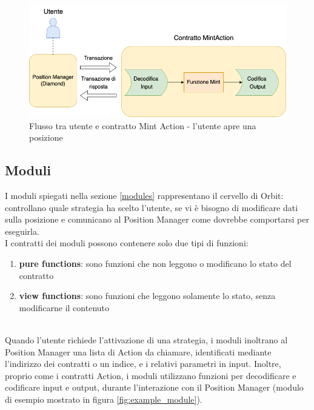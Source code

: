 \documentclass[12pt,a4paper]{report}
\begin{document}
\begin{figure}[H]
  \includegraphics[scale=0.50]{mint_action.png}
  \centering
  \caption{Flusso tra utente e contratto Mint Action - l'utente apre una posizione}
  \label{fig:mint_action}
\end{figure}



\subsection{Moduli}

I moduli spiegati nella sezione \ref{modules} rappresentano il cervello di Orbit: controllano quale strategia ha scelto l'utente, se vi è bisogno di modificare dati sulla posizione e comunicano al Position Manager come dovrebbe comportarsi per eseguirla.
\\I contratti dei moduli possono contenere solo due tipi di funzioni:
\\
\begin{enumerate}
    \item \textbf{pure functions}: sono funzioni che non leggono o modificano lo stato del contratto
    \item \textbf{view functions}: sono funzioni che leggono solamente lo stato, senza modificarne il contenuto
\end{enumerate}

\noindent\\Quando l'utente richiede l'attivazione di una strategia, i moduli inoltrano al Position Manager una lista di Action da chiamare, identificati mediante l'indirizzo dei contratti o un indice, e i relativi parametri in input. Inoltre, proprio come i contratti Action, i moduli utilizzano funzioni per decodificare e codificare input e output, durante l'interazione con il Position Manager (modulo di esempio mostrato in figura \ref{fig:example_module}).
\end{document}
